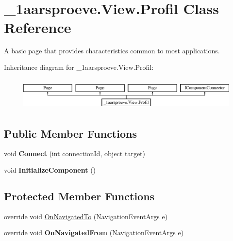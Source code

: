 \hypertarget{class__1aarsproeve_1_1_view_1_1_profil}{}\section{\+\_\+1aarsproeve.\+View.\+Profil Class Reference}
\label{class__1aarsproeve_1_1_view_1_1_profil}


A basic page that provides characteristics common to most applications.  


Inheritance diagram for \+\_\+1aarsproeve.\+View.\+Profil\+:\begin{figure}[H]
\begin{center}
\leavevmode
\includegraphics[height=1.696970cm]{class__1aarsproeve_1_1_view_1_1_profil}
\end{center}
\end{figure}
\subsection*{Public Member Functions}
\begin{DoxyCompactItemize}
\item 
\hypertarget{class__1aarsproeve_1_1_view_1_1_profil_aef76942d2b54a5a91a00c1da9e18fed0}{}void {\bfseries Connect} (int connection\+Id, object target)\label{class__1aarsproeve_1_1_view_1_1_profil_aef76942d2b54a5a91a00c1da9e18fed0}

\item 
\hypertarget{class__1aarsproeve_1_1_view_1_1_profil_a8a49f31d1274ad9f3d7dda340180166b}{}void {\bfseries Initialize\+Component} ()\label{class__1aarsproeve_1_1_view_1_1_profil_a8a49f31d1274ad9f3d7dda340180166b}

\end{DoxyCompactItemize}
\subsection*{Protected Member Functions}
\begin{DoxyCompactItemize}
\item 
override void \hyperlink{class__1aarsproeve_1_1_view_1_1_profil_ab9fe2415e3f9fab8b95a4d10f374b8dd}{On\+Navigated\+To} (Navigation\+Event\+Args e)
\item 
\hypertarget{class__1aarsproeve_1_1_view_1_1_profil_a0104213a42510d9bad8143e22947a0b6}{}override void {\bfseries On\+Navigated\+From} (Navigation\+Event\+Args e)\label{class__1aarsproeve_1_1_view_1_1_profil_a0104213a42510d9bad8143e22947a0b6}

\end{DoxyCompactItemize}
